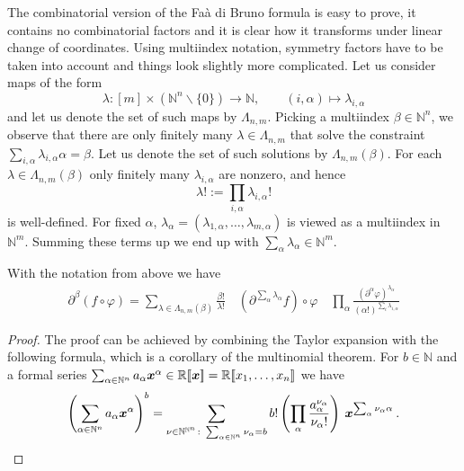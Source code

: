 The combinatorial version of the Fa{\`a} di Bruno formula is easy to prove, it contains no combinatorial factors and it is clear how it transforms under linear change of coordinates. Using multiindex notation, symmetry factors have to be taken into account and things look slightly more complicated. Let us consider maps of the form
\[\lambda:[m]\times (\mathbb N^n\backslash\{0\})\to \mathbb N,\qquad(i,\alpha)\mapsto \lambda_{i,\alpha}\] 
and let us denote the set of such maps by $\Lambda_{n,m}$. Picking a multiindex $\beta\in\mathbb N^n$, we observe that there are only finitely many  $\lambda\in\Lambda_{n,m}$ that solve the constraint $\sum_{i,\alpha}\lambda_{i,\alpha}\alpha=\beta$. Let us denote the set of such solutions by  $\Lambda_{n,m}(\beta)$. For each  $\lambda \in \Lambda_{n,m}(\beta)$ only finitely many $\lambda_{i,\alpha}$ are nonzero, and hence
  \[\lambda!:=\prod_{i,\alpha}\lambda_{i,\alpha}!\] is well-defined. For fixed $\alpha$, $\lambda_{\alpha}=(\lambda_{1,\alpha},\dots,\lambda_{m,\alpha})$ is viewed as a multiindex in $\mathbb N^m$. Summing these terms up we end up with $\sum_\alpha \lambda _\alpha\in\mathbb N^m$.

\begin{theorem}\label{FdBmulti} With the notation from above we have
  \begin{align*}
    \partial^\beta (f\circ \varphi) = \sum_{\lambda \in \Lambda_{n,m}(\beta)} \frac{\beta !}{\lambda !} \quad \left(\partial ^{\sum_{\alpha}\lambda_\alpha} f\right)\circ \varphi \quad \prod_{\alpha}\frac{\left(\partial^\alpha \varphi\right)^{\lambda_\alpha}}{(\alpha!)^{\sum_i \lambda_{i,\alpha}}}
  \end{align*}
\end{theorem}
\begin{proof} The proof can be achieved by combining the Taylor expansion with the following formula, which is a corollary of the multinomial theorem. For $b\in \mathbb N$ and a formal series $\sum_{\alpha\in \mathbb N^n} a_\alpha \boldsymbol x^\alpha\in \mathbb R [\![\boldsymbol x]\!]= \mathbb R[\![x_1,\dots,x_n]\!]$ we have
\[\left(\sum_{\alpha\in \mathbb N^n} a_\alpha \boldsymbol x^\alpha\right)^b=\sum_{\nu\in \mathbb N^{\mathbb N^n}\colon \sum_{\alpha\in \mathbb N^n}\nu_\alpha=b}b!\left(\prod_\alpha \frac{a_\alpha^{\nu_\alpha}}{\nu_\alpha !}\right)\: \boldsymbol x^{\sum_{\alpha}\nu_\alpha \alpha} \: .\]   
\end{proof}
